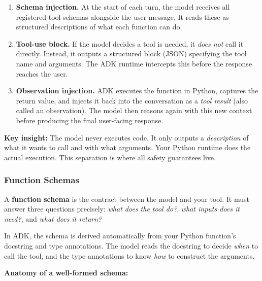 \documentclass[12pt, a4paper]{article}
\newcommand{\kterm}[1]{\textbf{\textcolor{keyterm}{#1}}}
\begin{document}
\begin{theorybox}
\begin{enumerate}[leftmargin=*, itemsep=3pt]
  \item \textbf{Schema injection.} At the start of each turn, the model receives all registered tool schemas alongside the user message. It reads these as structured descriptions of what each function can do.
  \item \textbf{Tool-use block.} If the model decides a tool is needed, it \emph{does not} call it directly. Instead, it outputs a structured block (JSON) specifying the tool name and arguments. The ADK runtime intercepts this before the response reaches the user.
  \item \textbf{Observation injection.} ADK executes the function in Python, captures the return value, and injects it back into the conversation as a \emph{tool result} (also called an observation). The model then reasons again with this new context before producing the final user-facing response.
\end{enumerate}

\begin{notebox}
\textbf{Key insight:} The model never executes code. It only outputs a \emph{description} of what it wants to call and with what arguments. Your Python runtime does the actual execution. This separation is where all safety guarantees live.
\end{notebox}

\subsubsection*{Function Schemas}

A \kterm{function schema} is the contract between the model and your tool. It must answer three questions precisely: \emph{what does the tool do?}, \emph{what inputs does it need?}, and \emph{what does it return?}

In ADK, the schema is derived automatically from your Python function's docstring and type annotations. The model reads the docstring to decide \emph{when} to call the tool, and the type annotations to know \emph{how} to construct the arguments.

\medskip

\noindent\textbf{Anatomy of a well-formed schema:}


\end{theorybox}
\end{document}
